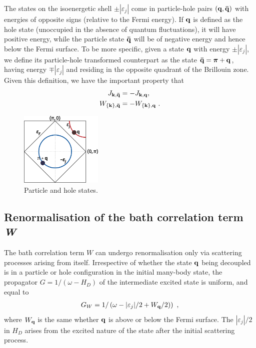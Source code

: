 \documentclass[reprint,hidelinks,onecolumn]{revtex4-2}
\begin{document}
The states on the isoenergetic shell \(\pm|\varepsilon_j|\) come in particle-hole pairs \(\left( {\bf q}, {\bf \bar q} \right) \) with energies of opposite signs (relative to the Fermi energy). If \({\bf q}\) is defined as the hole state (unoccupied in the absence of quantum fluctuations), it will have positive energy, while the particle state \({\bf \bar q}\) will be of negative energy and hence below the Fermi surface. To be more specific, given a state \({\bf q}\) with energy \(\pm|\varepsilon_j|\), we define its particle-hole transformed counterpart as the state \({\bf \bar q} = \boldsymbol{\pi} + {\bf q}\), having energy \(\mp|\varepsilon_j|\) and residing in the opposite quadrant of the Brillouin zone. Given this definition, we have the important property that
\begin{equation}\begin{aligned}\label{particleHoleRelation}
	J_{{\bf k}, {\bf \bar q}} &= -J_{{\bf k}, {\bf q}},\\
	W_{\left\{{\bf k}\right\}, {\bf \bar q}} &= -W_{\left\{{\bf k}\right\}, {\bf q}}~.
\end{aligned}\end{equation}

\begin{figure}[htpb]
	\centering
	\includegraphics[width=0.35\textwidth]{particleHoleRelation.pdf}
	\caption{Particle and hole states.}
	\label{fig:particleHoleRelation-pdf}
\end{figure}
\subsection{Renormalisation of the bath correlation term {\it W}}
The bath correlation term \(W\) can undergo renormalisation only via scattering processes arising from itself. Irrespective of whether the state \({\bf q}\) being decoupled is in a particle or hole configuration in the initial many-body state, the propagator \(G = 1/(\omega - H_D)\) of the intermediate excited state is uniform, and equal to 
\begin{equation}\begin{aligned}\label{propagatorW}
	G_W = 1/\left(\omega - |\varepsilon_j|/2 + W_{\bf q}/2)\right)~,
\end{aligned}\end{equation}
where \(W_{\bf q}\) is the same whether \({\bf q}\) is above or below the Fermi surface. The \(|\varepsilon_j|/2\) in \(H_D\) arises from the excited nature of the state after the initial scattering process.
\end{document}
